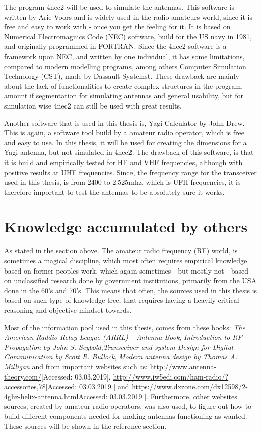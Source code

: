 The program 4nec2\cite{4nec2} will be used to simulate the antennas. This software is written by Arie Voors and is widely used in the radio amateurs world, since it is free and easy to work with - once you get the feeling for it. It is based on Numerical Electromagnics Code (NEC) software\cite{nec}, build for the US navy in 1981, and originally programmed in FORTRAN\cite{Fortran}. Since the 4nec2 software is a framework upon NEC, and written by one individual, it has some limitations, compared to modern modelling programs, among others Computer Simulation Technology (CST), made by Dassault Systemst\cite{Dassault}. These drawback are mainly about the lack of functionalities to create complex structures in the program, amount if segmentation for simulating antennas and general usability, but for simulation wise 4nec2 can still be used with great results. 

Another software that is used in this thesis is, Yagi Calculator by John Drew\cite{yagical}. This is again, a software tool build by a amateur radio operator, which is free and easy to use. In this thesis, it will be used for creating the dimensions for a Yagi antenna, but not simulated in 4nec2. The drawback of this software, is that it is build and empirically tested for HF and VHF frequencies, although with positive results at UHF frequencies. Since, the frequency range for the transceiver used in this thesis, is from 2400 to 2.525mhz, which is UFH frequencies, it is therefore important to test the antennas to be absolutely sure it works.  

\section{Knowledge accumulated by others}
As stated in the section above. The amateur radio frequency (RF) world, is sometimes a magical discipline, which most often requires empirical knowledge based on former peoples work, which again sometimes - but mostly not - based on unclassified research done by government institutions, primarily from the USA done in the 60's and 70's. This means that often, the sources used in this thesis is based on such type of knowledge tree, that requires having a heavily critical reasoning and objective mindset towards.

Most of the information pool used in this thesis, comes from these books: \textit{The American Raddio Relay League (ARRL) - Antenna Book}\cite{ARRL}, \textit{Introduction to RF Propagation by John S. Seybold}\cite{RFpropagation},\textit{Transceiver and system Design for Digital Communication by Scott R. Bullock}\cite{TransceiverBook}, \textit{Modern antenna design by Thomas A. Milligan}\cite{modernantenna} and from important websites such as: \url{http://www.antenna-theory.com/}[Accessed: 03.03.2019], \url{http://www.iw5edi.com/ham-radio/?accessories,78}[Accessed: 03.03.2019 ] and \url{	https://www.dxzone.com/dx12598/2-4ghz-helix-antenna.html}Accessed: 03.03.2019 ]. Furthermore, other websites sources, created by amateur radio operators, was also used, to figure out how to build different components needed for making  antennas functioning as wanted. These sources will be shown in the reference section.

